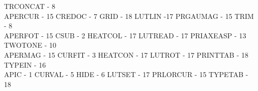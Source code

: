 {\begin{tabbing}
   \>TRCONCAT - 8                            \\
 APERCUR - 15                            \>CREDOC - 7
   \>GRID - 18                               \>
 LUTLIN -17                              \>PRGAUMAG - 15
   \>TRIM - 8                                \\
 APERFOT - 15                            \>CSUB - 2
   \>HEATCOL - 17                            \>
 LUTREAD - 17                            \>PRIAXEASP - 13
   \>TWOTONE - 10                            \\
 APERMAG - 15                            \>CURFIT - 3
   \>HEATCON - 17                            \>
 LUTROT - 17                             \>PRINTTAB - 18
   \>TYPEIN - 16                             \\
 APIC - 1                                \>CURVAL - 5
   \>HIDE - 6                                \>
 LUTSET - 17                             \>PRLORCUR - 15
   \>TYPETAB - 18                            \\
\end{tabbing}

\vspace{-8mm}

}
